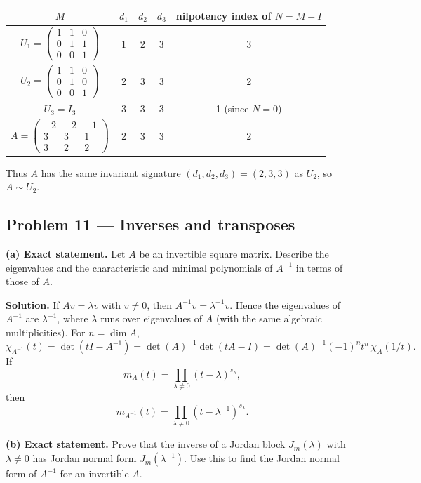 \documentclass[12pt,a4paper]{article}
\theoremstyle{plain}
\theoremstyle{definition}      %
\begin{document}
\medskip
\begin{center}
	\begin{tabular}{c|ccc|c}
		$M$ & $d_1$ & $d_2$ & $d_3$ & nilpotency index of $N=M-I$\\ \hline
		$U_1=\begin{pmatrix}1&1&0\\0&1&1\\0&0&1\end{pmatrix}$ & 1 & 2 & 3 & 3\\[6pt]
		$U_2=\begin{pmatrix}1&1&0\\0&1&0\\0&0&1\end{pmatrix}$ & 2 & 3 & 3 & 2\\[6pt]
		$U_3=I_3$ & 3 & 3 & 3 & 1 (since $N=0$)\\[6pt]
		$A=\begin{pmatrix}-2&-2&-1\\3&3&1\\3&2&2\end{pmatrix}$ & 2 & 3 & 3 & 2
	\end{tabular}
\end{center}

\medskip
Thus $A$ has the same invariant signature $(d_1,d_2,d_3)=(2,3,3)$ as $U_2$, so $A\sim U_2$.


\subsection*{Problem 11 — Inverses and transposes}

\textbf{(a) Exact statement.}
Let $A$ be an invertible square matrix. Describe the eigenvalues and the characteristic and minimal polynomials of $A^{-1}$ in terms of those of $A$.

\textbf{Solution.}
If $Av=\lambda v$ with $v\neq 0$, then $A^{-1}v=\lambda^{-1}v$. Hence the eigenvalues of $A^{-1}$ are $\lambda^{-1}$, where $\lambda$ runs over eigenvalues of $A$ (with the same algebraic multiplicities).
For $n=\dim A$,
\[
\chi_{A^{-1}}(t)=\det(tI-A^{-1})
=\det(A)^{-1}\det(tA-I)
=\det(A)^{-1}(-1)^n t^n\,\chi_A(1/t).
\]
If
\[
m_A(t)=\prod_{\lambda\neq 0}(t-\lambda)^{s_\lambda},
\]
then
\[
m_{A^{-1}}(t)=\prod_{\lambda\neq 0}(t-\lambda^{-1})^{s_\lambda}.
\]

\medskip
\textbf{(b) Exact statement.}
Prove that the inverse of a Jordan block $J_m(\lambda)$ with $\lambda\neq 0$ has Jordan normal form $J_m(\lambda^{-1})$.
Use this to find the Jordan normal form of $A^{-1}$ for an invertible $A$.
\end{document}
